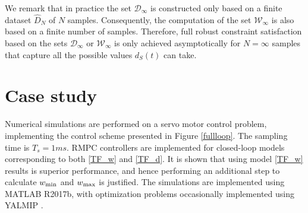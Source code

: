 \documentclass[letterpaper, 10 pt, conference]{ieeeconf}  %
\begin{document}

We remark that in practice the set $\mathcal{D}_{\infty}$ is constructed only based on a finite dataset $\hat{D}_{N}$ of $N$ samples. Consequently, the computation of the set $\mathcal{W}_{\infty}$ is also based  on a finite number of samples. Therefore, full robust
constraint satisfaction based on the sets $\mathcal{D}_{\infty}$ or $\mathcal{W}_{\infty}$
is only achieved asymptotically for $N=\infty$ samples
that capture all the possible values $d_S(t)$ can take.

\section{Case study}
	Numerical simulations are performed on a servo motor control problem, implementing the control scheme presented in Figure \ref{fullloop}. The sampling time is $T_s = 1 ms$. RMPC controllers are implemented for closed-loop models corresponding to both \eqref{TF_w} and \eqref{TF_d}. It is shown that using model \eqref{TF_w} results is superior performance, and hence performing an additional step to calculate $w_{\rm min}$ and $w_{\rm max}$ is justified.
	The simulations are implemented using MATLAB R2017b, with optimization problems occasionally implemented using YALMIP \cite{Lofberg2004}.
	\label{Case studies}
	\iffalse
\end{document}
